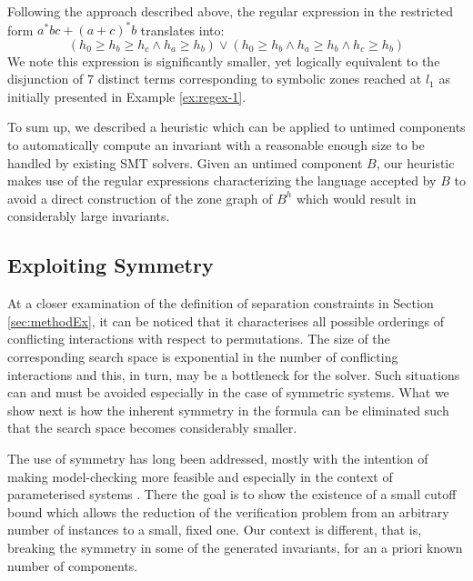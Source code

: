\documentclass{LMCS}
\theoremstyle{plain}\newtheorem{remark}[thm]{Remark}
\theoremstyle{plain}\newtheorem{example}[thm]{Example}
\begin{document}
\begin{exa}
  Following the approach described above, the regular expression in
  the restricted form $a^*bc + (a+c)^*b$ translates into:
  \[ (h_0 \geq h_b \geq h_c \wedge h_a \geq h_b) \vee (h_0 \geq h_b
  \wedge h_a \geq h_b \wedge h_c \geq h_b ) \] We note this expression
  is significantly smaller, yet logically equivalent to the
  disjunction of $7$ distinct terms corresponding to symbolic zones
  reached at $l_1$ as initially presented in Example \ref{ex:regex-1}.
\end{exa}

To sum up, we described a heuristic which can be applied to untimed
components to automatically compute an invariant with a reasonable
enough size to be handled by existing SMT solvers. Given an untimed
component $B$, our heuristic makes use of the regular expressions
characterizing the language accepted by $B$ to avoid a direct
construction of the zone graph of $B^h$ which would result in
considerably large invariants. 







\subsection{Exploiting Symmetry}
\label{sec:sym}

At a closer examination of the definition of separation constraints in
Section \ref{sec:methodEx}, it can be noticed that it characterises
all possible orderings of conflicting interactions with respect to
permutations.  The size of the corresponding search space is
exponential in the number of conflicting interactions and this, in
turn, may be a bottleneck for the solver. Such situations can and
must be avoided especially in the case of symmetric systems. What we
show next is how the inherent symmetry in the formula can be
eliminated such that the search space becomes considerably smaller.

The use of symmetry has long been addressed, mostly with the intention
of making model-checking more feasible and especially in the context
of parameterised systems
\cite{emersonN95,emersonS96,emersonK00,namjoshi07}.  There the goal is
to show the existence of a small cutoff bound which allows the
reduction of the verification problem from an arbitrary number of
instances to a small, fixed one.  Our context is different, that is,
breaking the symmetry in some of the generated invariants, for an
a priori known number of components.
\end{document}
